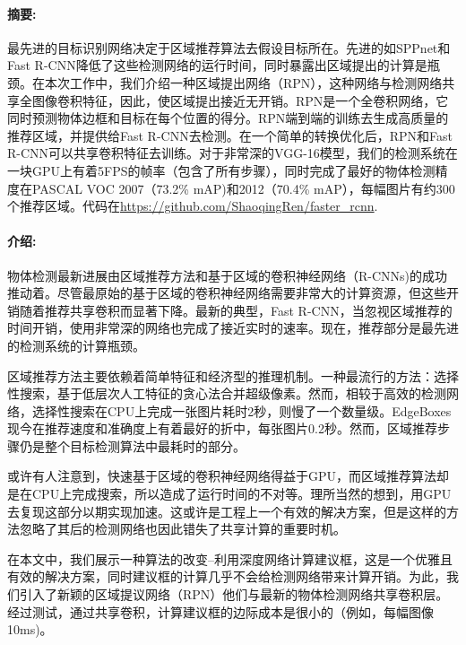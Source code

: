\documentclass[12pt,a4paper,titlepage]{article}
\begin{document}
\paragraph {摘要:}
最先进的目标识别网络决定于区域推荐算法去假设目标所在。先进的如SPPnet和Fast R-CNN降低了这些检测网络的运行时间，同时暴露出区域提出的计算是瓶颈。在本次工作中，我们介绍一种区域提出网络（RPN），这种网络与检测网络共享全图像卷积特征，因此，使区域提出接近无开销。RPN是一个全卷积网络，它同时预测物体边框和目标在每个位置的得分。RPN端到端的训练去生成高质量的推荐区域，并提供给Fast R-CNN去检测。在一个简单的转换优化后，RPN和Fast R-CNN可以共享卷积特征去训练。对于非常深的VGG-16模型，我们的检测系统在一块GPU上有着5FPS的帧率（包含了所有步骤），同时完成了最好的物体检测精度在PASCAL VOC 2007（73.2\% mAP)和2012（70.4\% mAP），每幅图片有约300个推荐区域。代码在\url{https://github.com/ShaoqingRen/faster_rcnn}.

\paragraph{介绍:}
物体检测最新进展由区域推荐方法和基于区域的卷积神经网络（R-CNNs)的成功推动着。尽管最原始的基于区域的卷积神经网络需要非常大的计算资源，但这些开销随着推荐共享卷积而显著下降。最新的典型，Fast R-CNN，当忽视区域推荐的时间开销，使用非常深的网络也完成了接近实时的速率。现在，推荐部分是最先进的检测系统的计算瓶颈。\par

区域推荐方法主要依赖着简单特征和经济型的推理机制。一种最流行的方法：选择性搜索，基于低层次人工特征的贪心法合并超级像素。然而，相较于高效的检测网络，选择性搜索在CPU上完成一张图片耗时2秒，则慢了一个数量级。EdgeBoxes现今在推荐速度和准确度上有着最好的折中，每张图片0.2秒。然而，区域推荐步骤仍是整个目标检测算法中最耗时的部分。\par

或许有人注意到，快速基于区域的卷积神经网络得益于GPU，而区域推荐算法却是在CPU上完成搜索，所以造成了运行时间的不对等。理所当然的想到，用GPU去复现这部分以期实现加速。这或许是工程上一个有效的解决方案，但是这样的方法忽略了其后的检测网络也因此错失了共享计算的重要时机。\par

在本文中，我们展示一种算法的改变--利用深度网络计算建议框，这是一个优雅且有效的解决方案，同时建议框的计算几乎不会给检测网络带来计算开销。为此，我们引入了新颖的区域提议网络（RPN）他们与最新的物体检测网络共享卷积层。经过测试，通过共享卷积，计算建议框的边际成本是很小的（例如，每幅图像10ms)。\par
\end{document}
